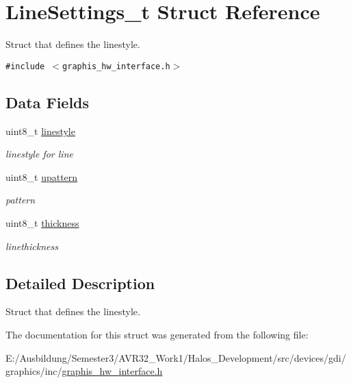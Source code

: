 \hypertarget{struct_line_settings__t}{
\section{LineSettings\_\-t Struct Reference}
\label{struct_line_settings__t}
}
Struct that defines the linestyle.  


{\tt \#include $<$graphis\_\-hw\_\-interface.h$>$}

\subsection*{Data Fields}
\begin{CompactItemize}
\item 
\hypertarget{struct_line_settings__t_27efb6814de80d28b7960d393b334b59}{
uint8\_\-t \hyperlink{struct_line_settings__t_27efb6814de80d28b7960d393b334b59}{linestyle}}
\label{struct_line_settings__t_27efb6814de80d28b7960d393b334b59}

\begin{CompactList}\small\item\em linestyle for line \item\end{CompactList}\item 
\hypertarget{struct_line_settings__t_ff0408d73969e35342d800a9e500c638}{
uint8\_\-t \hyperlink{struct_line_settings__t_ff0408d73969e35342d800a9e500c638}{upattern}}
\label{struct_line_settings__t_ff0408d73969e35342d800a9e500c638}

\begin{CompactList}\small\item\em pattern \item\end{CompactList}\item 
\hypertarget{struct_line_settings__t_889ae907839c117021f51409ed219e46}{
uint8\_\-t \hyperlink{struct_line_settings__t_889ae907839c117021f51409ed219e46}{thickness}}
\label{struct_line_settings__t_889ae907839c117021f51409ed219e46}

\begin{CompactList}\small\item\em linethickness \item\end{CompactList}\end{CompactItemize}


\subsection{Detailed Description}
Struct that defines the linestyle. 

The documentation for this struct was generated from the following file:\begin{CompactItemize}
\item 
E:/Ausbildung/Semester3/AVR32\_\-Work1/Halos\_\-Development/src/devices/gdi/graphics/inc/\hyperlink{graphis__hw__interface_8h}{graphis\_\-hw\_\-interface.h}\end{CompactItemize}
